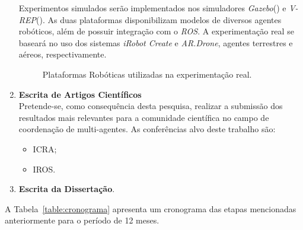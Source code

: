 \begin{enumerate}
    Experimentos simulados serão implementados nos simuladores \emph{Gazebo}(\cite{Gazebo}) e \emph{V-REP}(\cite{VREP}). As duas plataformas disponibilizam modelos de diversos agentes robóticos, além de possuir integração com o \emph{ROS}. A experimentação real se baseará no uso dos sistemas \emph{iRobot Create} e \emph{AR.Drone}, agentes terrestres e aéreos, respectivamente.

    \begin{figure}[!h]
      \centering


      \caption{Plataformas Robóticas utilizadas na experimentação real.}
      \label{fig:robos}

    \end{figure}


    \item \textbf{Escrita de Artigos Científicos}\\
    Pretende-se, como consequência desta pesquisa, realizar a submissão dos resultados mais relevantes para a comunidade científica no campo de coordenação de multi-agentes. As conferências alvo deste trabalho são:
        \begin{itemize}
            \item ICRA;
            \item IROS.
        \end{itemize}

    \item \textbf{Escrita da Dissertação}.
\end{enumerate}

A Tabela~\ref{table:cronograma} apresenta um cronograma das etapas mencionadas anteriormente para o período de 12 meses.

